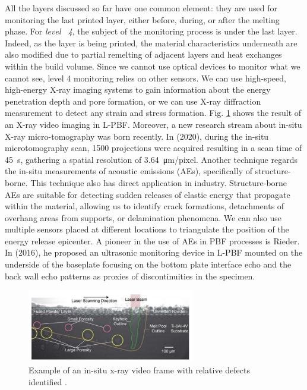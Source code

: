 All the layers discussed so far have one common element: they are used for monitoring the last printed layer, either before, during, or after the melting phase. For \emph{level ~4}, the subject of the monitoring process is under the last layer. Indeed, as the layer is being printed, the material characteristics underneath are also modified due to partial remelting of adjacent layers and heat exchanges within the build volume. Since we cannot use optical devices to monitor what we cannot see, level 4 monitoring relies on other sensors. We can use high-speed, high-energy X-ray imaging systems to gain information about the energy penetration depth and pore formation, or we can use X-ray diffraction measurement to detect any strain and stress formation. Fig. \ref{fig:xray4} shows the result of an X-ray video imaging in L-PBF. Moreover, a new research stream about in-situ X-ray micro-tomography was born recently. In \citeauthor{lhuissier_situ_2020} (2020), during the in-situ microtomography scan, 1500 projections were acquired resulting in a scan time of \SI{45}{s}, gathering a spatial resolution of \SI{3.64}{\micro\metre / pixel}. Another technique regards the in-situ measurements of acoustic emissions (AEs), specifically of structure-borne. This technique also has direct application in industry. Structure-borne AEs are suitable for detecting sudden releases of elastic energy that propagate within the material, allowing us to identify crack formations, detachments of overhang areas from supports, or delamination phenomena. We can also use multiple sensors placed at different locations to triangulate the position of the energy release epicenter. A pioneer in the use of AEs in PBF processes is Rieder. In \citeauthor{rieder_-_2016} (2016), he proposed an ultrasonic monitoring device in L-PBF mounted on the underside of the baseplate focusing on the bottom plate interface echo and the back wall echo patterns as proxies of discontinuities in the specimen.
\begin{figure}
    \centering
    \includegraphics[width=0.65\textwidth]{Images/xray4.png}
    \caption[X-ray video frame.]{Example of an in-situ x-ray video frame with relative defects identified \cite{paulson_correlations_2020}.}
    \label{fig:xray4}
\end{figure}

